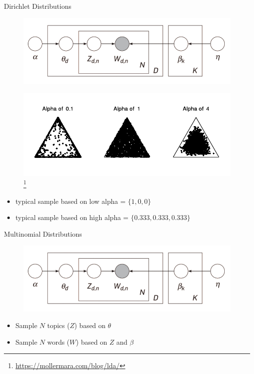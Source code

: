 \begin{frame}{\insertsubsection}{Dirichlet Distributions}
    \begin{figure}
        \centering
        \includegraphics[width = 0.65 \textwidth]{figures/lda_model.jpg}
    \end{figure}
    \begin{figure}
        \centering
        \includegraphics[width = 0.65 \textwidth]{figures/dirich.png}
        \footnote{\url{https://mollermara.com/blog/lda/}}
    \end{figure}
    \begin{itemize}
        \item<2> typical sample based on low alpha = $\{1,0,0\}$
        \item<2> typical sample based on high alpha = $\{0.333, 0.333, 0.333\}$
    \end{itemize}
\end{frame}

\begin{frame}{\insertsubsection}{Multinomial Distributions}
    \begin{figure}
        \centering
        \includegraphics[width = 0.65 \textwidth]{figures/lda_model.jpg}
    \end{figure}
    \begin{itemize}
        \item Sample $N$ topics ($Z$) based on $\theta$
        \item Sample $N$ words ($W$) based on $Z$ and $\beta$
    \end{itemize}
\end{frame}

